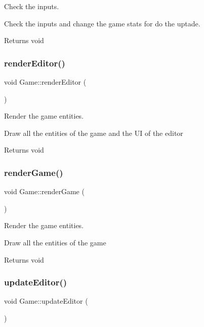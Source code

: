 Check the inputs. 

Check the inputs and change the game stats for do the uptade.

\begin{DoxyReturn}{Returns}
void 
\end{DoxyReturn}
\mbox{\label{class_game_a204ea65111892ca826f3a65cc8818ea7}} 
\subsubsection{\texorpdfstring{render\+Editor()}{renderEditor()}}
{\footnotesize\ttfamily void Game\+::render\+Editor (\begin{DoxyParamCaption}{ }\end{DoxyParamCaption})}



Render the game entities. 

Draw all the entities of the game and the UI of the editor

\begin{DoxyReturn}{Returns}
void 
\end{DoxyReturn}
\mbox{\label{class_game_a4573580347746dbb7dbe568383682ed3}} 
\subsubsection{\texorpdfstring{render\+Game()}{renderGame()}}
{\footnotesize\ttfamily void Game\+::render\+Game (\begin{DoxyParamCaption}{ }\end{DoxyParamCaption})}



Render the game entities. 

Draw all the entities of the game

\begin{DoxyReturn}{Returns}
void 
\end{DoxyReturn}
\mbox{\label{class_game_a81abd2f677aba0c3f068c902d690e2fb}} 
\subsubsection{\texorpdfstring{update\+Editor()}{updateEditor()}}
{\footnotesize\ttfamily void Game\+::update\+Editor (\begin{DoxyParamCaption}{ }\end{DoxyParamCaption})}



